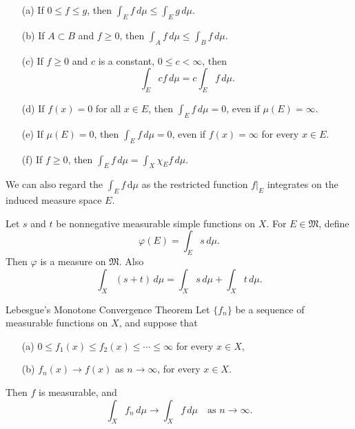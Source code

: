 \documentclass[../main.tex]{subfiles}
\begin{document}
\begin{corollary}{}{}
    \begin{enumerate}
    \item[(a)] If $0 \le f \le g$, then $\int_E f \, d\mu \le \int_E g \, d\mu$.
    \item[(b)] If $A \subset B$ and $f \ge 0$, then $\int_A f \, d\mu \le \int_B f \, d\mu$.
    \item[(c)] If $f \ge 0$ and $c$ is a constant, $0 \le c < \infty$, then
    \[
    \int_E cf \, d\mu = c \int_E f \, d\mu.
    \]
    \item[(d)] If $f(x) = 0$ for all $x \in E$, then $\int_E f \, d\mu = 0$, even if $\mu(E) = \infty$.
    \item[(e)] If $\mu(E) = 0$, then $\int_E f \, d\mu = 0$, even if $f(x) = \infty$ for every $x \in E$.
    \item[(f)] If $f \ge 0$, then $\int_E f \, d\mu = \int_X \chi_E f \, d\mu$.
\end{enumerate}
\end{corollary}

\begin{remark}
    We can also regard the \(  \int_{E} f \,\mathrm{d} \mu   \) as the restricted function \(  f|_{E}  \)  integrates on the induced measure space  \(  E  \). 
\end{remark}


\begin{proposition}{}{}
Let $s$ and $t$ be nonnegative measurable simple functions on $X$. For $E \in \mathfrak{M}$, define
\[
\varphi(E) = \int_E s \, d\mu.
\]
Then $\varphi$ is a measure on $\mathfrak{M}$. Also
\[
\int_X (s + t) \, d\mu = \int_X s \, d\mu + \int_X t \, d\mu.
\]
\end{proposition}

\begin{theorem}{Lebesgue's Monotone Convergence Theorem}{}
Let $\{f_n\}$ be a sequence of measurable functions on $X$, and suppose that
\begin{enumerate}
\item[(a)] $0 \le f_1(x) \le f_2(x) \le \cdots \le \infty$ for every $x \in X$,
\item[(b)] $f_n(x) \to f(x)$ as $n \to \infty$, for every $x \in X$.
\end{enumerate}
Then $f$ is measurable, and
\[
\int_X f_n \, d\mu \to \int_X f \, d\mu \quad \text{as } n \to \infty.
\]
\end{theorem}
\end{document}
